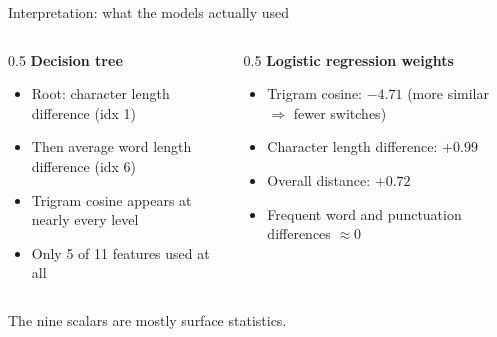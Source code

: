 \documentclass[aspectratio=169,11pt]{beamer}
\begin{document}
\begin{frame}{Interpretation: what the models actually used}
\begin{columns}[T]
\begin{column}{0.5\textwidth}
\textbf{Decision tree}
\begin{itemize}\itemsep0.3em
\item Root: character length difference (idx 1)
\item Then average word length difference (idx 6)
\item Trigram cosine appears at nearly every level
\item Only 5 of 11 features used at all
\end{itemize}
\end{column}
\begin{column}{0.5\textwidth}
\textbf{Logistic regression weights}
\begin{itemize}\itemsep0.3em
\item Trigram cosine: $-4.71$ (more similar $\Rightarrow$ fewer switches)
\item Character length difference: $+0.99$
\item Overall distance: $+0.72$
\item Frequent word and punctuation differences $\approx 0$
\end{itemize}
\end{column}
\end{columns}
\bigskip
\begin{alertblock}{}
The nine scalars are mostly surface statistics. 
\end{alertblock}
\end{frame}
\end{document}
